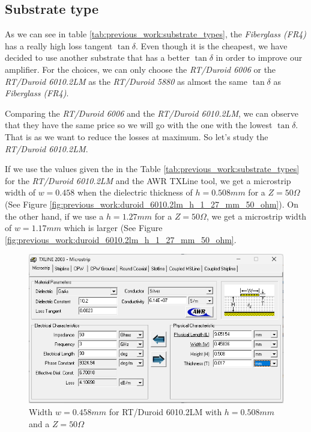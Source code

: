 \documentclass[12pt]{report} %
\begin{document}
\subsection{Substrate type}

As we can see in table \ref{tab:previous_work:substrate_types}, the \textit{Fiberglass (FR4)} has a really high loss tangent $\tan \delta$. Even though it is the cheapest, we have decided to use another substrate that has a better $\tan \delta$ in order to improve our amplifier. For the choices, we can only choose the \textit{RT/Duroid 6006} or the \textit{RT/Duroid 6010.2LM} as the \textit{RT/Duroid 5880} as almost the same $\tan \delta$ as \textit{Fiberglass (FR4)}.

Comparing the  \textit{RT/Duroid 6006} and the \textit{RT/Duroid 6010.2LM}, we can observe that they have the same price so we will go with the one with the lowest $\tan \delta$. That is as we want to reduce the losses at maximum. So let's study the \textit{RT/Duroid 6010.2LM}. 

If we use the values given the in the Table \ref{tab:previous_work:substrate_types} for the \textit{RT/Duroid 6010.2LM} and the AWR TXLine tool, we get a microstrip width of $w = 0.458 $ when the dielectric thickness of $h = 0.508 mm $ for a $Z = 50 \Omega$ (See Figure \ref{fig:previous_work:duroid_6010.2lm_h_1_27_mm_50_ohm}). On the other hand, if we use a $h = 1.27 mm$ for a $Z = 50 \Omega$, we get a microstrip width of $w = 1.17 mm$ which is larger (See Figure \ref{fig:previous_work:duroid_6010.2lm_h_1_27_mm_50_ohm}.

\begin{figure}[htbp]
    \centering
    \includegraphics[width=\textwidth]{images/previous_work/txline_tool_duroid_6010.2lm_h_0_508_mm_50_ohm.png}
    \caption{Width $w = 0.458 mm$ for RT/Duroid 6010.2LM with $h = 0.508 mm$ and a $Z = 50 \Omega$}
    \label{fig:previous_work:duroid_6010.2lm_h_0_508_mm_50_ohm}
\end{figure}
\end{document}
